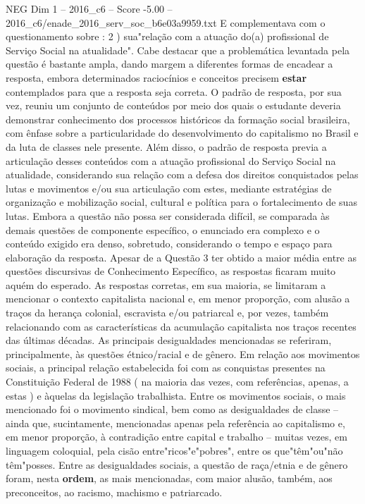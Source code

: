 \begin{textsample}{NEG Dim 1 – 2016\_c6 – Score -5.00 – 2016\_c6/enade\_2016\_serv\_soc\_b6e03a9959.txt}
E complementava com o questionamento sobre : 2 ) sua"relação com a atuação do(a) profissional de Serviço Social na atualidade".
Cabe destacar que a problemática levantada pela questão é bastante ampla, dando margem a diferentes formas de encadear a resposta, embora determinados raciocínios e conceitos precisem \textbf{estar} contemplados para que a resposta seja correta.
O padrão de resposta, por sua vez, reuniu um conjunto de conteúdos por meio dos quais o estudante deveria demonstrar conhecimento dos processos históricos da formação social brasileira, com ênfase sobre a particularidade do desenvolvimento do capitalismo no Brasil e da luta de classes nele presente.
Além disso, o padrão de resposta previa a articulação desses conteúdos com a atuação profissional do Serviço Social na atualidade, considerando sua relação com a defesa dos direitos conquistados pelas lutas e movimentos e/ou sua articulação com estes, mediante estratégias de organização e mobilização social, cultural e política para o fortalecimento de suas lutas.
Embora a questão não possa ser considerada difícil, se comparada às demais questões de componente específico, o enunciado era complexo e o conteúdo exigido era denso, sobretudo, considerando o tempo e espaço para elaboração da resposta.
Apesar de a Questão 3 ter obtido a maior média entre as questões discursivas de Conhecimento Específico, as respostas ficaram muito aquém do esperado.
As respostas corretas, em sua maioria, se limitaram a mencionar o contexto capitalista nacional e, em menor proporção, com alusão a traços da herança colonial, escravista e/ou patriarcal e, por vezes, também relacionando com as características da acumulação capitalista nos traços recentes das últimas décadas.
As principais desigualdades mencionadas se referiram, principalmente, às questões étnico/racial e de gênero.
Em relação aos movimentos sociais, a principal relação estabelecida foi com as conquistas presentes na Constituição Federal de 1988 ( na maioria das vezes, com referências, apenas, a estas ) e àquelas da legislação trabalhista.
Entre os movimentos sociais, o mais mencionado foi o movimento sindical, bem como as desigualdades de classe – ainda que, sucintamente, mencionadas apenas pela referência ao capitalismo e, em menor proporção, à contradição entre capital e trabalho – muitas vezes, em linguagem coloquial, pela cisão entre"ricos"e"pobres", entre os que"têm"ou"não têm"posses.
Entre as desigualdades sociais, a questão de raça/etnia e de gênero foram, nesta \textbf{ordem}, as mais mencionadas, com maior alusão, também, aos preconceitos, ao racismo, machismo e patriarcado.

\end{textsample}
